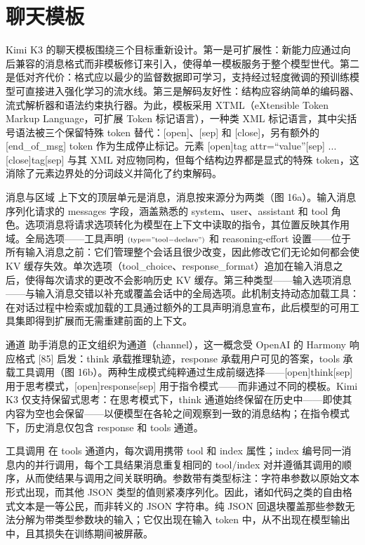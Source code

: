 \section{聊天模板}\label{f-chat-template}

Kimi K3 的聊天模板围绕三个目标重新设计。第一是可扩展性：新能力应通过向后兼容的消息格式而非模板修订来引入，使得单一模板服务于整个模型世代。第二是低对齐代价：格式应以最少的监督数据即可学习，支持经过轻度微调的预训练模型可直接进入强化学习的流水线。第三是解码友好性：结构应容纳简单的编码器、流式解析器和语法约束执行器。为此，模板采用 XTML（eXtensible Token Markup Language，可扩展 Token 标记语言），一种类 XML 标记语言，其中尖括号语法被三个保留特殊 token 替代：{[}open{]}、{[}sep{]} 和 {[}close{]}，另有额外的 {[}end\_of\_msg{]} token 作为生成停止标记。元素 {[}open{]}tag attr=``value''{[}sep{]} ... {[}close{]}tag{[}sep{]} 与其 XML 对应物同构，但每个结构边界都是显式的特殊 token，这消除了元素边界处的分词歧义并简化了约束解码。

消息与区域 上下文的顶层单元是消息，消息按来源分为两类（图 16a）。输入消息序列化请求的 messages 字段，涵盖熟悉的 system、user、assistant 和 tool 角色。选项消息将请求选项转化为模型在上下文中读取的指令，其位置反映其作用域。全局选项——工具声明 \(\scriptstyle \left( \mathrm{type = "tool-declare"} \right)\) 和 reasoning-effort 设置——位于所有输入消息之前：它们管理整个会话且很少改变，因此修改它们无论如何都会使 KV 缓存失效。单次选项（tool\_choice、response\_format）追加在输入消息之后，使得每次请求的更改不会影响历史 KV 缓存。第三种类型——输入选项消息——与输入消息交错以补充或覆盖会话中的全局选项。此机制支持动态加载工具：在对话过程中检索或加载的工具通过额外的工具声明消息宣布，此后模型的可用工具集即得到扩展而无需重建前面的上下文。

通道 助手消息的正文组织为通道（channel），这一概念受 OpenAI 的 Harmony 响应格式 {[}85{]} 启发：think 承载推理轨迹，response 承载用户可见的答案，tools 承载工具调用（图 16b）。两种生成模式纯粹通过生成前缀选择——{[}open{]}think{[}sep{]} 用于思考模式，{[}open{]}response{[}sep{]} 用于指令模式——而非通过不同的模板。Kimi K3 仅支持保留式思考：在思考模式下，think 通道始终保留在历史中——即使其内容为空也会保留——以便模型在各轮之间观察到一致的消息结构；在指令模式下，历史消息仅包含 response 和 tools 通道。

工具调用 在 tools 通道内，每次调用携带 tool 和 index 属性；index 编号同一消息内的并行调用，每个工具结果消息重复相同的 tool/index 对并遵循其调用的顺序，从而使结果与调用之间关联明确。参数带有类型标注：字符串参数以原始文本形式出现，而其他 JSON 类型的值则紧凑序列化。因此，诸如代码之类的自由格式文本是一等公民，而非转义的 JSON 字符串。纯 JSON 回退块覆盖那些参数无法分解为带类型参数块的输入；它仅出现在输入 token 中，从不出现在模型输出中，且其损失在训练期间被屏蔽。


